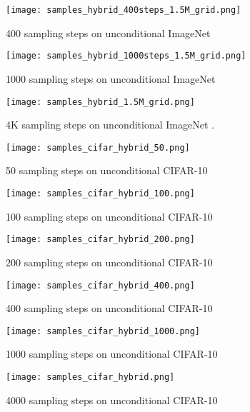\documentclass{article}
\begin{document}
\newpage
\begin{figure}[h!]
    \centerline{\texttt{[image: samples\_hybrid\_400steps\_1.5M\_grid.png]}}
    \caption{400 sampling steps on unconditional ImageNet }
\end{figure}
\begin{figure}[h!]
    \centerline{\texttt{[image: samples\_hybrid\_1000steps\_1.5M\_grid.png]}}
    \caption{1000 sampling steps on unconditional ImageNet }
\end{figure}
\begin{figure}[h!]
    \centerline{\texttt{[image: samples\_hybrid\_1.5M\_grid.png]}}
    \caption{\label{fig:lastimagenet} 4K sampling steps on unconditional ImageNet .}
    \vskip -0.4in
\end{figure}

\clearpage

\begin{figure}[h!]
    \centerline{\texttt{[image: samples\_cifar\_hybrid\_50.png]}}
    \caption{\label{fig:firstcifar} 50 sampling steps on unconditional CIFAR-10}
\end{figure}
\begin{figure}[h!]
    \centerline{\texttt{[image: samples\_cifar\_hybrid\_100.png]}}
    \caption{100 sampling steps on unconditional CIFAR-10}
\end{figure}
\begin{figure}[h!]
    \centerline{\texttt{[image: samples\_cifar\_hybrid\_200.png]}}
    \caption{200 sampling steps on unconditional CIFAR-10}
    \vskip -0.4in
\end{figure}
\newpage
\begin{figure}[h!]
    \centerline{\texttt{[image: samples\_cifar\_hybrid\_400.png]}}
    \caption{400 sampling steps on unconditional CIFAR-10}
\end{figure}
\begin{figure}[h!]
    \centerline{\texttt{[image: samples\_cifar\_hybrid\_1000.png]}}
    \caption{1000 sampling steps on unconditional CIFAR-10}
\end{figure}
\begin{figure}[h!]
    \centerline{\texttt{[image: samples\_cifar\_hybrid.png]}}
    \caption{\label{fig:lastcifar} 4000 sampling steps on unconditional CIFAR-10}
    \vskip -0.4in
\end{figure}
\end{document}
